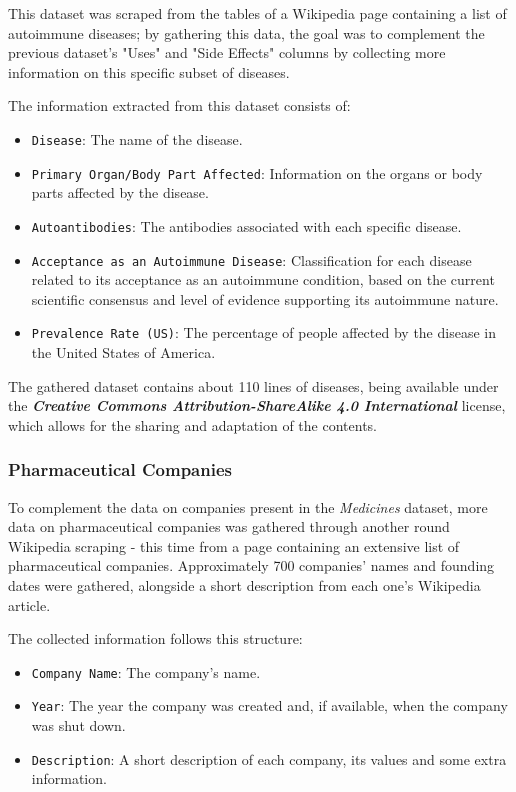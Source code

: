 \documentclass[sigconf]{acmart}
\begin{document}
This dataset was scraped from the tables of a Wikipedia page containing a list of autoimmune diseases\cite{diseases_dataset}; by gathering this data, the goal was to complement the previous dataset's "Uses" and "Side Effects" columns by collecting more information on this specific subset of diseases.

The information extracted from this dataset consists of:
\begin{itemize}
        \item {\texttt{Disease}}: The name of the disease.
	\item {\texttt{Primary Organ/Body Part Affected}}: Information on the organs or body parts affected by the disease.
	\item {\texttt{Autoantibodies}}: The antibodies associated with each specific disease.
	\item {\texttt{Acceptance as an Autoimmune Disease}}: Classification for each disease related to its acceptance as an autoimmune condition, based on the current scientific consensus and level of evidence supporting its autoimmune nature.
	\item {\texttt{Prevalence Rate (US)}}: The percentage of people affected by the disease in the United States of America.
\end{itemize}

The gathered dataset contains about 110 lines of diseases, being available under the \textit{\textbf{Creative Commons Attribution-ShareAlike 4.0 International}}\cite{wikipedia_cc} license, which allows for the sharing and adaptation of the contents.

\subsubsection{Pharmaceutical Companies}

To complement the data on companies present in the \textit{Medicines} dataset, more data on pharmaceutical companies was gathered through another round Wikipedia scraping - this time from a page containing an extensive list of pharmaceutical companies\cite{companies_dataset}. Approximately 700 companies' names and founding dates were gathered, alongside a short description from each one's Wikipedia article.

The collected information follows this structure:
\begin{itemize}
	\item {\texttt{Company Name}}: The company's name.
	\item {\texttt{Year}}: The year the company was created and, if available, when the company was shut down.
	\item {\texttt{Description}}: A short description of each company, its values and some extra information.
\end{itemize}
\end{document}
